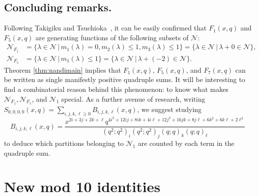 \documentclass[ALCO,Unicode,published]{cedram}
\newcommand{\sN}{\mathscr{N}}
\begin{document}
\subsection{Concluding remarks.} 
Following Takigiku and Tsuchioka~\cite{TakTsu-nandi}, it can be easily confirmed that $F_1(x,q)$ and $F_5(x,q)$ are generating functions of the following subsets of $\sN$:
\begin{align}
\sN_{F_1}&=\{ \lambda\in \sN\,\vert\, m_1(\lambda)=0, m_2(\lambda)\leq 1, m_3(\lambda)\leq 1\}
=\{ \lambda\in \sN\,\vert\, \lambda+0\in \sN\},
\\
\sN_{F_5}&=\{ \lambda\in \sN\,\vert\, m_1(\lambda)\leq 1\}
=\{ \lambda\in \sN\,\vert\, \lambda+(-2)\in \sN\}.
\end{align}
Theorem \ref{thm:nandimain} implies that $F_1(x,q)$, $F_5(x,q)$, and $F_7(x,q)$ can be written as single manifestly positive quadruple sums. It will be interesting to find a combinatorial reason behind this phenomenon: to know what makes $\sN_{F_1}, \sN_{F_5}$, and $\sN_{1}$ special. As a further avenue of research, writing $S_{0,0,0,0}(x,q) = \sum_{i,j,k,\ell\ge 0} B_{i,j,k,\ell} (x,q)$, we suggest studying  
\begin{equation}
B_{i,j,k,\ell} (x,q) = \frac{x^{2i+3j+2k+\ell} q^{4i^2 + 12 ij + 8ik + 4i\ell + 12j^2 + 16jk + 8j\ell + 6k^2+6k\ell+2\ell^2}}
{\left(q^2;q^2\right)_i\left(q^2;q^2\right)_j\left(q;q\right)_k\left(q;q\right)_\ell}
\end{equation}
to deduce which partitions belonging to $\sN_1$ are counted by each term in the quadruple sum.



\section{New mod 10 identities}
\label{sec:mod10}
\end{document}
